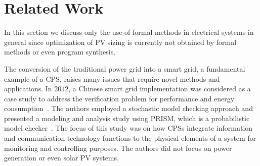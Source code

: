 %
 
\section{Related Work}

In this section we discuss only the use of formal methods in electrical systems in general since optimization of PV sizing is currently not obtained by formal methods or even program synthesis. %

The conversion of the traditional power grid into a smart grid, a fundamental example of a CPS, raises many issues that require novel methods and applications. In $2012$, a Chinese smart grid implementation was considered as a case study to address the verification problem for performance and energy consumption~\cite{Yukseletall2012}. The authors employed a stochastic model checking approach and presented a modeling and analysis study using PRISM, which is a probabilistic model checker~\cite{KwiatkowskaNP11}. The focus of this study was on how CPSs integrate information and communication technology functions to the physical elements of a system for monitoring and controlling purposes. The authors did not focus on power generation or even solar PV systems.


